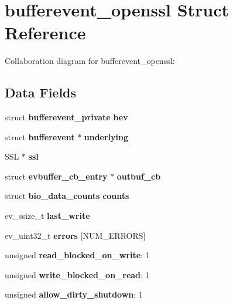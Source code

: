 \section{bufferevent\-\_\-openssl \-Struct \-Reference}
\label{structbufferevent__openssl}


\-Collaboration diagram for bufferevent\-\_\-openssl\-:
\subsection*{\-Data \-Fields}
\begin{DoxyCompactItemize}
\item 
struct {\bf bufferevent\-\_\-private} {\bfseries bev}\label{structbufferevent__openssl_ac89d86467e491d6accc55fc1aaea8a13}

\item 
struct {\bf bufferevent} $\ast$ {\bfseries underlying}\label{structbufferevent__openssl_a28dd39cec675d7f406ea714d8b4aa00c}

\item 
\-S\-S\-L $\ast$ {\bfseries ssl}\label{structbufferevent__openssl_ae7c0417fa2881f3546920311fee80311}

\item 
struct {\bf evbuffer\-\_\-cb\-\_\-entry} $\ast$ {\bfseries outbuf\-\_\-cb}\label{structbufferevent__openssl_aaba8f48af30064e0972e59231278c55f}

\item 
struct {\bf bio\-\_\-data\-\_\-counts} {\bfseries counts}\label{structbufferevent__openssl_affe881de4afbd9f36f03eac98147f170}

\item 
ev\-\_\-ssize\-\_\-t {\bfseries last\-\_\-write}\label{structbufferevent__openssl_a3d7537a9ce610acf371488094e6faa7b}

\item 
ev\-\_\-uint32\-\_\-t {\bfseries errors} [\-N\-U\-M\-\_\-\-E\-R\-R\-O\-R\-S]\label{structbufferevent__openssl_ab84df83ba233271c988389524f6392b9}

\item 
unsigned {\bfseries read\-\_\-blocked\-\_\-on\-\_\-write}\-: 1\label{structbufferevent__openssl_aceacae97f22565fb5e36baddb4b3753b}

\item 
unsigned {\bfseries write\-\_\-blocked\-\_\-on\-\_\-read}\-: 1\label{structbufferevent__openssl_ae16491f77bd5f5ba859f2dced2b7b4bf}

\item 
unsigned {\bfseries allow\-\_\-dirty\-\_\-shutdown}\-: 1\label{structbufferevent__openssl_a55563a4c169245436bad1eb821eeb501}


\end{DoxyCompactItemize}
